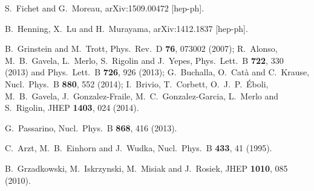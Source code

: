  S.~Fichet and G.~Moreau,
  arXiv:1509.00472 [hep-ph].

  B.~Henning, X.~Lu and H.~Murayama,
  arXiv:1412.1837 [hep-ph].
  
  B.~Grinstein and M.~Trott,
  Phys.\ Rev.\ D {\bf 76}, 073002 (2007);
  R.~Alonso, M.~B.~Gavela, L.~Merlo, S.~Rigolin and J.~Yepes,
  Phys.\ Lett.\ B {\bf 722}, 330 (2013) and 
  Phys.\ Lett.\ B {\bf 726}, 926 (2013);
  G.~Buchalla, O.~Cat\`a and C.~Krause,
  Nucl.\ Phys.\ B {\bf 880}, 552 (2014);
  I.~Brivio, T.~Corbett, O.~J.~P.~\'Eboli, M.~B.~Gavela, J.~Gonzalez-Fraile, M.~C.~Gonzalez-Garcia, L.~Merlo and S.~Rigolin,
  JHEP {\bf 1403}, 024 (2014).

  G.~Passarino,
  Nucl.\ Phys.\ B {\bf 868}, 416 (2013).
  
  C.~Arzt, M.~B.~Einhorn and J.~Wudka,
  Nucl.\ Phys.\ B {\bf 433}, 41 (1995).

  B.~Grzadkowski, M.~Iskrzynski, M.~Misiak and J.~Rosiek,
  JHEP {\bf 1010}, 085 (2010).

